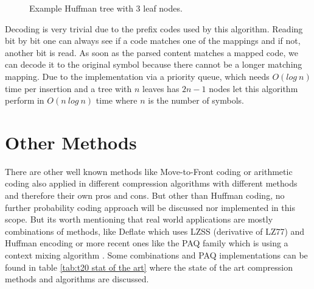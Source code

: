 {\begin{figure}[h]
	\centering
{}
	\caption{Example Huffman tree with 3 leaf nodes.} \label{fig:M1:example Huffman tree}
\end{figure}
}
\par{
Decoding is very trivial due to the prefix codes used by this algorithm. Reading bit by bit one can always see if a code matches one of the mappings and if not, another bit is read. As soon as the parsed content matches a mapped code, we can decode it to the original symbol because there cannot be a longer matching mapping. Due to the implementation via a priority queue, which needs $O(log \: n)$ time per insertion and a tree with $n$ leaves has $2n-1$ nodes let this algorithm perform in $O(n \: log \: n)$ time where $n$ is the number of symbols.
}

\section{Other Methods}
\label{ch:Principles of compression:sec:Other}
\par{
There are other well known methods like Move-to-Front coding or arithmetic coding also applied in different compression algorithms with different methods and therefore their own pros and cons. But other than Huffman coding, no further probability coding approach will be discussed nor implemented in this scope. But its worth mentioning that real world applications are mostly combinations of methods, like Deflate\cite{deutsch1996rfc1951} which uses LZSS\cite{10.1145/322344.322346} (derivative of LZ77) and Huffman encoding or more recent ones like the PAQ family which is using a context mixing algorithm \cite{mahoney2009data}. Some combinations and PAQ implementations can be found in table \ref{tab:t20 stat of the art} where the state of the art compression methods and algorithms are discussed.
}

